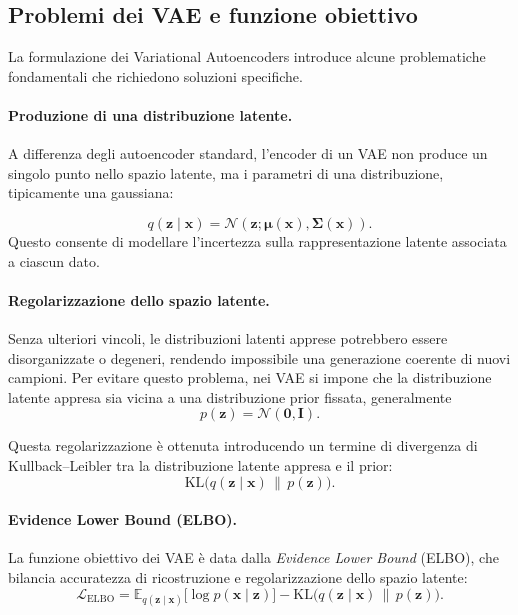 \documentclass[a4paper,12pt]{report}
\begin{document}
\subsection{Problemi dei VAE e funzione obiettivo}

La formulazione dei Variational Autoencoders introduce alcune problematiche fondamentali che richiedono soluzioni specifiche.

\paragraph{Produzione di una distribuzione latente.}
A differenza degli autoencoder standard, l’encoder di un VAE non produce un singolo punto nello spazio latente, ma i parametri di 
una distribuzione, tipicamente una gaussiana:

\[
q(\mathbf{z} \mid \mathbf{x}) = \mathcal{N}(\mathbf{z}; \boldsymbol{\mu}(\mathbf{x}), \boldsymbol{\Sigma}(\mathbf{x})).
\]
Questo consente di modellare l’incertezza sulla rappresentazione latente associata a ciascun dato.

\paragraph{Regolarizzazione dello spazio latente.}
Senza ulteriori vincoli, le distribuzioni latenti apprese potrebbero essere disorganizzate o degeneri, rendendo impossibile una generazione coerente di nuovi campioni. Per evitare questo problema, nei VAE si impone che la distribuzione latente appresa sia vicina a una distribuzione prior fissata, generalmente
\[
p(\mathbf{z}) = \mathcal{N}(\mathbf{0}, \mathbf{I}).
\]

Questa regolarizzazione è ottenuta introducendo un termine di divergenza di Kullback--Leibler tra la distribuzione latente appresa e il prior:
\[
\mathrm{KL}\bigl(q(\mathbf{z} \mid \mathbf{x}) \,\|\, p(\mathbf{z})\bigr).
\]

\paragraph{Evidence Lower Bound (ELBO).}
La funzione obiettivo dei VAE è data dalla \emph{Evidence Lower Bound} (ELBO), che bilancia accuratezza di ricostruzione e regolarizzazione dello spazio latente:
\[
\mathcal{L}_{\text{ELBO}} =
\mathbb{E}_{q(\mathbf{z} \mid \mathbf{x})}
\bigl[\log p(\mathbf{x} \mid \mathbf{z})\bigr]
-
\mathrm{KL}\bigl(q(\mathbf{z} \mid \mathbf{x}) \,\|\, p(\mathbf{z})\bigr).
\]
\end{document}

